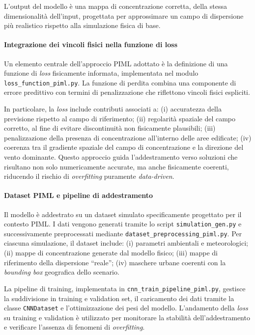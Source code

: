 L’output del modello è una mappa di concentrazione corretta, della stessa dimensionalità dell’input, progettata per approssimare un campo di dispersione più realistico rispetto alla simulazione fisica di base.

\paragraph{Integrazione dei vincoli fisici nella funzione di loss}

Un elemento centrale dell’approccio PIML adottato è la definizione di una funzione di \textit{loss} fisicamente informata, implementata nel modulo \texttt{loss\_function\_piml.py}.
La funzione di perdita combina una componente di errore predittivo con termini di penalizzazione che riflettono vincoli fisici espliciti.

In particolare, la \textit{loss} include contributi associati a:
(i) accuratezza della previsione rispetto al campo di riferimento;
(ii) regolarità spaziale del campo corretto, al fine di evitare discontinuità non fisicamente plausibili;
(iii) penalizzazione della presenza di concentrazione all’interno delle aree edificate;
(iv) coerenza tra il gradiente spaziale del campo di concentrazione e la direzione del vento dominante.
Questo approccio guida l’addestramento verso soluzioni che risultano non solo numericamente accurate, ma anche fisicamente coerenti, riducendo il rischio di \textit{overfitting} puramente \textit{data-driven}.

\paragraph{Dataset PIML e pipeline di addestramento}

Il modello è addestrato su un dataset simulato specificamente progettato per il contesto PIML.
I dati vengono generati tramite lo script \texttt{simulation\_gen.py} e successivamente preprocessati mediante \texttt{dataset\_preprocessing\_piml.py}.
Per ciascuna simulazione, il dataset include:
(i) parametri ambientali e meteorologici;
(ii) mappe di concentrazione generate dal modello fisico;
(iii) mappe di riferimento della dispersione ``reale'';
(iv) maschere urbane coerenti con la \textit{bounding box} geografica dello scenario.

La pipeline di training, implementata in \texttt{cnn\_train\_pipeline\_piml.py}, gestisce la suddivisione in training e validation set, il caricamento dei dati tramite la classe \texttt{CNNDataset} e l’ottimizzazione dei pesi del modello.
L’andamento della \textit{loss} su training e validation è utilizzato per monitorare la stabilità dell’addestramento e verificare l’assenza di fenomeni di \textit{overfitting}.

